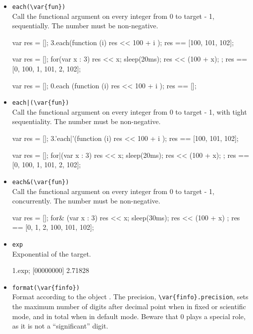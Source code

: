 \begin{itemize}
\item \lstinline|each(\var{fun})|\\
  Call the functional argument  on every integer from 0 to
  target - 1, sequentially.  The number must be non-negative.
\begin{urbiassert}
{
  var res = [];
  3.each(function (i) { res << 100 + i });
  res
}
== [100, 101, 102];

{
  var res = [];
  for(var x : 3) { res << x; sleep(20ms); res << (100 + x); };
  res
}
== [0, 100, 1, 101, 2, 102];

{
  var res = [];
  0.each (function (i) { res << 100 + i });
  res
}
== [];
\end{urbiassert}

\item \lstinline'each|(\var{fun})'\\
  Call the functional argument  on every integer from 0 to
  target - 1, with tight sequentiality.  The number must be
  non-negative.
\begin{urbiassert}
{
  var res = [];
  3.'each|'(function (i) { res << 100 + i });
  res
}
== [100, 101, 102];

{
  var res = [];
  for|(var x : 3) { res << x; sleep(20ms); res << (100 + x); };
  res
}
== [0, 100, 1, 101, 2, 102];
\end{urbiassert}%

\item \lstinline|each&(\var{fun})|\\
  Call the functional argument  on every integer from 0 to
  target - 1, concurrently.  The number must be non-negative.
\begin{urbiassert}
{
  var res = [];
  for& (var x : 3) { res << x; sleep(30ms); res << (100 + x) };
  res
}
== [0, 1, 2, 100, 101, 102];
\end{urbiassert}%

\item \lstinline|exp|\\
  Exponential of the target.
\begin{urbiscript}
1.exp;
[00000000] 2.71828
\end{urbiscript}

\item \lstinline|format(\var{finfo})|\\
  Format according to the  object .
  The precision, \lstinline|\var{finfo}.precision|, sets the maximum
  number of digits after decimal point when in fixed or scientific
  mode, and in total when in default mode.  Beware that 0 plays a
  special role, as it is not a ``significant'' digit.


\end{itemize}
